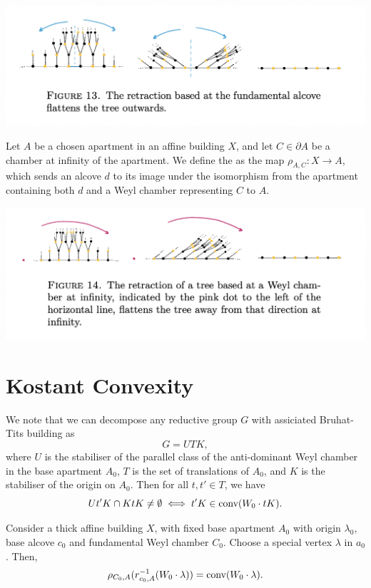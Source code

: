 \documentclass[11pt]{article}
\begin{document}
\\
\includegraphics[scale=0.6]{Screenshot 2023-02-15 at 13.32.45.png}
\begin{definition}
    Let $A$ be a chosen apartment in an affine building $X$, and let $C\in \partial A$ be a chamber at infinity of the apartment. We define the  as the map $\rho_{A,C}:X\longrightarrow A$, which sends an alcove $d$ to its image under the isomorphism from the apartment containing both $d$ and a Weyl chamber representing $C$ to $A$. 
\end{definition}


\includegraphics[scale=0.6]{Screenshot 2023-02-15 at 13.31.58.png}


\section{Kostant Convexity}

\begin{theorem}
    We note that we can decompose any reductive group $G$ with assiciated Bruhat-Tits building as
    \[G=UTK,\]
    where $U$ is the stabiliser of the parallel class of the anti-dominant Weyl chamber in the base apartment $A_0$, $T$ is the set of translations of $A_0$, and $K$ is the stabiliser of the origin on $A_0$. 
    Then for all $t,t'\in T$, we have
    \[Ut'K\cap KtK\neq \emptyset \iff t'K\in\textnormal{conv}(W_0\cdot tK).\]
\end{theorem}


\begin{theorem}
    Consider a thick affine building $X$, with fixed base apartment $A_0$ with origin $\lambda_0$, base alcove $c_0$ and fundamental Weyl chamber $C_0$. Choose a special vertex $\lambda$ in $a_0$. Then,
    \[\rho_{C_0,A}(r^{-1}_{c_0,A}(W_0\cdot\lambda))=\textnormal{conv}(W_0\cdot \lambda).\]
\end{theorem}
\end{document}

